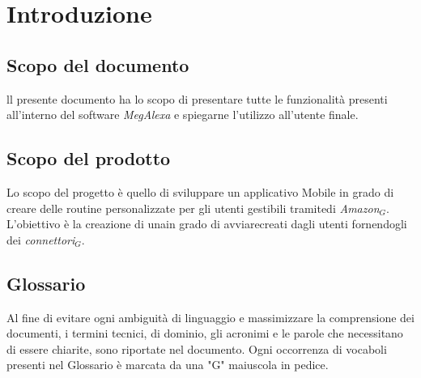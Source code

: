 \chapter{Introduzione}
\label{Introduzione}

\section{Scopo del documento}
ll presente documento ha lo scopo di presentare tutte le funzionalità presenti all'interno del software \textit{MegAlexa} e spiegarne l'utilizzo all'utente finale.

\section{Scopo del prodotto}
Lo scopo del progetto è  quello di sviluppare un applicativo Mobile in grado di creare delle routine personalizzate per gli utenti gestibili tramitedi \textit{Amazon$_{G}$}. L’obiettivo è la creazione di unain grado di avviarecreati dagli utenti fornendogli dei \textit{connettori$_{G}$}.


\section{Glossario}
Al fine di evitare ogni ambiguità di linguaggio e massimizzare la comprensione dei documenti, i termini tecnici, di dominio, gli acronimi e le parole che necessitano di essere chiarite, sono riportate nel documento.
Ogni occorrenza di vocaboli presenti nel Glossario è marcata da una "G" maiuscola in pedice.
